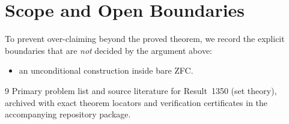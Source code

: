 \documentclass[10pt,reqno]{amsart}
\theoremstyle{definition}
\begin{document}
\section{Scope and Open Boundaries}

To prevent over-claiming beyond the proved theorem, we record the explicit boundaries that are \emph{not} decided by the argument above:
\begin{itemize}
  \item an unconditional construction inside bare ZFC.
\end{itemize}

\begin{thebibliography}{9}
Primary problem list and source literature for Result~1350 (set theory), archived with exact theorem locators and verification certificates in the accompanying repository package.
\end{thebibliography}
\end{document}
